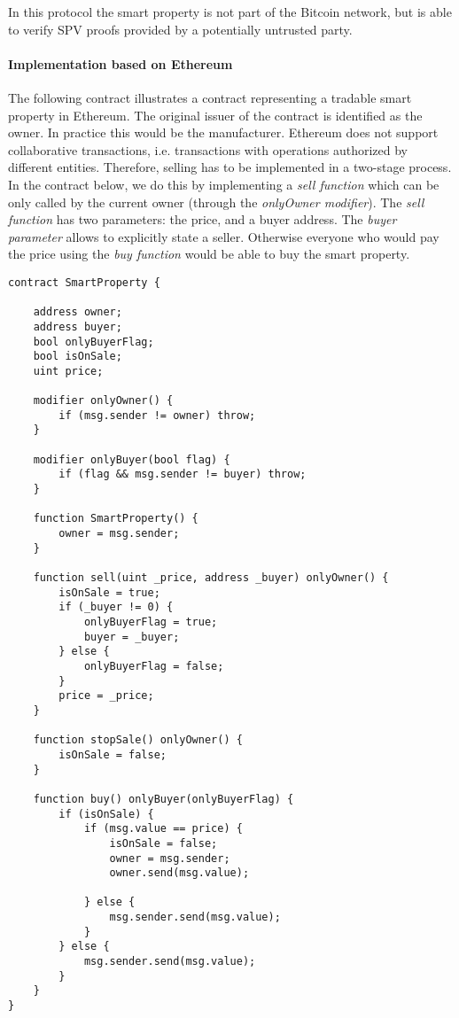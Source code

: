 In this protocol the smart property is not part of the Bitcoin network, but is able to verify SPV proofs provided by a potentially untrusted party. 

\paragraph{Implementation based on Ethereum}

The following contract illustrates a contract representing a tradable smart property in Ethereum. The original issuer of the contract is identified as the owner. In practice this would be the manufacturer. Ethereum does not support collaborative transactions, i.e. transactions with operations authorized by different entities. Therefore, selling has to be implemented in a two-stage process. In the contract below, we do this by implementing a \emph{sell function} which can be only called by the current owner (through the \emph{onlyOwner modifier}). The \emph{sell function} has two parameters: the price, and a buyer address. The \emph{buyer parameter} allows to explicitly state a seller. Otherwise everyone who would pay the price using the \emph{buy function} would be able to buy the smart property.

\newpage
\begin{lstlisting}[breaklines,basicstyle=\tiny]
contract SmartProperty {
    
    address owner;
    address buyer;
    bool onlyBuyerFlag;
    bool isOnSale;
    uint price;
    
    modifier onlyOwner() {
        if (msg.sender != owner) throw;
    }
    
    modifier onlyBuyer(bool flag) {
        if (flag && msg.sender != buyer) throw;
    }
    
    function SmartProperty() {
        owner = msg.sender;
    }
    
    function sell(uint _price, address _buyer) onlyOwner() {
        isOnSale = true;
        if (_buyer != 0) {
            onlyBuyerFlag = true;
            buyer = _buyer;
        } else {
            onlyBuyerFlag = false;
        }
        price = _price;
    }
    
    function stopSale() onlyOwner() {
        isOnSale = false;
    }
        
    function buy() onlyBuyer(onlyBuyerFlag) {
        if (isOnSale) {
            if (msg.value == price) {
                isOnSale = false;
                owner = msg.sender;
                owner.send(msg.value);
                
            } else {
                msg.sender.send(msg.value);
            }
        } else {
            msg.sender.send(msg.value);
        }
    }
}
\end{lstlisting}


